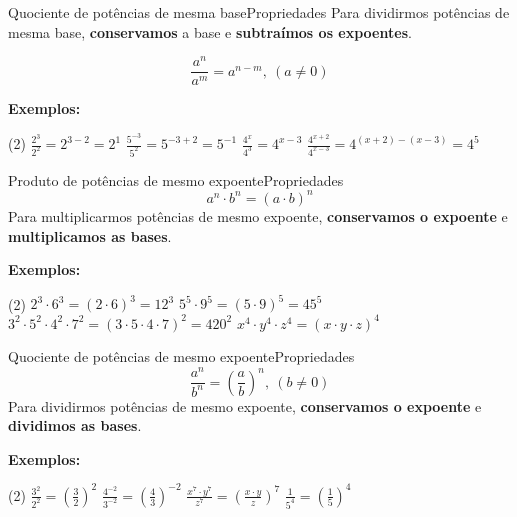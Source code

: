 \documentclass[aspectratio=169,10pt]{uu-beamer}
\begin{document}
    \begin{frame}{Quociente de potências de mesma base}{Propriedades}
        Para dividirmos potências de mesma base, \textbf{conservamos} a base e \textbf{subtraímos os expoentes}.
        
        \[\frac{a^n}{a^m} = a^{n-m}, ~(a \neq 0)\]
        
        \vspace{1cm}
        \textbf{Exemplos:}
        
        \begin{tasks}(2)
            \task \(\frac{2^3}{2^2} = 2^{3-2} = 2^1\)
            \task \(\frac{5^{-3}}{5^{2}} = 5^{-3+2} = 5^{-1}\)
            \task \(\frac{4^x}{4^3} = 4^{x-3}\)
            \task \(\frac{4^{x+2}}{4^{x-3}} = 4^{(x+2)-(x-3)} = 4^{5}\)
        \end{tasks}
    \end{frame}
    
    \begin{frame}{Produto de potências de mesmo expoente}{Propriedades}
        \[a^n \cdot b^n = (a \cdot b)^n\]
        Para multiplicarmos potências de mesmo expoente, \textbf{conservamos o expoente} e \textbf{multiplicamos as bases}.
        
        \vspace{1cm}
        \textbf{Exemplos:}
        
        \begin{tasks}(2)
            \task \(2^3 \cdot 6^3 = (2 \cdot 6)^3 = 12^3\)
            \task \(5^5 \cdot 9^5 = (5 \cdot 9)^5 = 45^5\)
            \task \(3^2 \cdot 5^2 \cdot 4^2 \cdot 7^2= (3 \cdot 5 \cdot 4 \cdot 7)^2 = 420^2\)
            \task \(x^4 \cdot y^4 \cdot z^4 = (x \cdot y \cdot z)^4\)
        \end{tasks}
    \end{frame}
    
    \begin{frame}{Quociente de potências de mesmo expoente}{Propriedades}
        \[\frac{a^n}{b^n} = \left( \frac{a}{b} \right)^n,~(b \neq 0) \]
        Para dividirmos potências de mesmo expoente, \textbf{conservamos o expoente} e \textbf{dividimos as bases}.
        
        
        \vspace{1cm}
        \textbf{Exemplos:}
        \begin{tasks}(2)
            \task \(\frac{3^2}{2^2} = \left(\frac{3}{2} \right)^2\)
            \task \(\frac{4^{-2}}{3^{-2}} = \left( \frac{4}{3}\right)^{-2}\)
            \task \(\frac{x^7 \cdot y^7}{z^7} = \left(\frac{x \cdot y}{z} \right)^7\)
            \task \(\frac{1}{5^4} = \left( \frac{1}{5}\right)^4\)
        \end{tasks}
    \end{frame}
    
\end{document}
